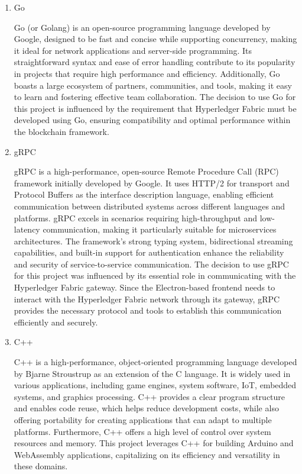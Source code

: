 \documentclass[conference]{IEEEtran}
\begin{document}
\begin{enumerate}[itemsep=2ex, parsep=1ex]
		\item Go

			Go (or Golang) is an open-source programming language developed by Google,
			designed to be fast and concise while supporting concurrency, making it
			ideal for network applications and server-side programming. Its straightforward
			syntax and ease of error handling contribute to its popularity in projects
			that require high performance and efficiency. Additionally, Go boasts a large
			ecosystem of partners, communities, and tools, making it easy to learn and
			fostering effective team collaboration. The decision to use Go for this project
			is influenced by the requirement that Hyperledger Fabric must be developed
			using Go, ensuring compatibility and optimal performance within the
			blockchain framework.

		\item gRPC

			gRPC is a high-performance, open-source Remote Procedure Call (RPC) framework
			initially developed by Google. It uses HTTP/2 for transport and Protocol
			Buffers as the interface description language, enabling efficient communication
			between distributed systems across different languages and platforms. gRPC
			excels in scenarios requiring high-throughput and low-latency
			communication, making it particularly suitable for microservices architectures.
			The framework's strong typing system, bidirectional streaming capabilities,
			and built-in support for authentication enhance the reliability and
			security of service-to-service communication. The decision to use gRPC for
			this project was influenced by its essential role in communicating with the
			Hyperledger Fabric gateway. Since the Electron-based frontend needs to
			interact with the Hyperledger Fabric network through its gateway, gRPC provides
			the necessary protocol and tools to establish this communication efficiently
			and securely.

		\item C++

			C++ is a high-performance, object-oriented programming language developed by
			Bjarne Stroustrup as an extension of the C language. It is widely used in
			various applications, including game engines, system software, IoT,
			embedded systems, and graphics processing. C++ provides a clear program
			structure and enables code reuse, which helps reduce development costs,
			while also offering portability for creating applications that can adapt
			to multiple platforms. Furthermore, C++ offers a high level of control
			over system resources and memory. This project leverages C++ for building Arduino
			and WebAssembly applications, capitalizing on its efficiency and
			versatility in these domains.


\end{enumerate}
\end{document}
